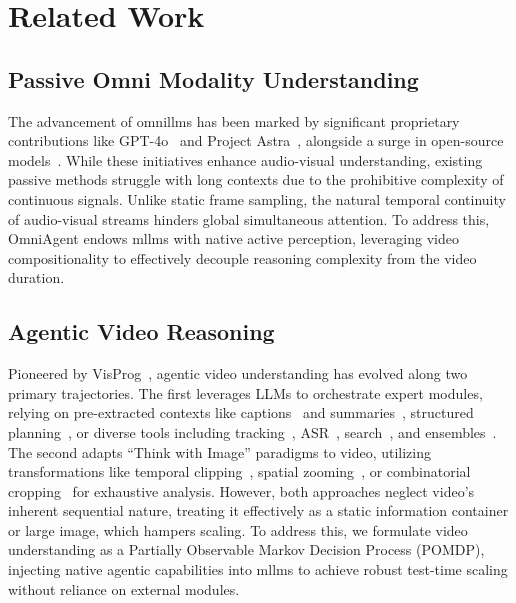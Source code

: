 \documentclass{article}
\theoremstyle{plain}
\theoremstyle{definition}
\theoremstyle{remark}
\newcommand{\model}{OmniAgent\xspace}
\begin{document}
\section{Related Work}
\label{sec:relatedwork}
\subsection{Passive Omni Modality Understanding}
\vspace{-1mm}
The advancement of \acp{omnillm} has been marked by significant proprietary contributions like GPT-4o~\cite{gpt4o} and Project Astra~\cite{projectastra}, alongside a surge in open-source models~\cite{vita, li2024baichuanomni, videollama2, qwen2.5omni, xing2025echoink, video-salmonn2, humanomniv2, qwen3omni, longcat-flash-omni}. While these initiatives enhance audio-visual understanding, existing passive methods struggle with long contexts due to the prohibitive complexity of continuous signals. Unlike static frame sampling, the natural temporal continuity of audio-visual streams hinders global simultaneous attention. To address this, \model endows \acp{mllm} with native active perception, leveraging video compositionality to effectively decouple reasoning complexity from the video duration.

\vspace{-2mm}
\subsection{Agentic Video Reasoning}
\vspace{-1mm}
Pioneered by VisProg~\cite{visprog}, agentic video understanding has evolved along two primary trajectories. The first leverages LLMs to orchestrate expert modules, relying on pre-extracted contexts like captions~\cite{video-agent} and summaries~\cite{lifelongmemory, drvideo}, structured planning~\cite{vca, doraemongpt, videotree}, or diverse tools including tracking~\cite{videoagent}, ASR~\cite{avagent}, search~\cite{dvd, m3-agent}, and ensembles~\cite{lvagent}. The second adapts ``Think with Image'' paradigms to video, utilizing transformations like temporal clipping~\cite{vital, longvt}, spatial zooming~\cite{zoomzero}, or combinatorial cropping~\cite{videocom} for exhaustive analysis. However, both approaches neglect video's inherent sequential nature, treating it effectively as a static information container or large image, which hampers scaling. To address this, we formulate video understanding as a Partially Observable Markov
Decision Process (POMDP), injecting native agentic capabilities into \acp{mllm} to achieve robust test-time scaling without reliance on external modules.
\end{document}
